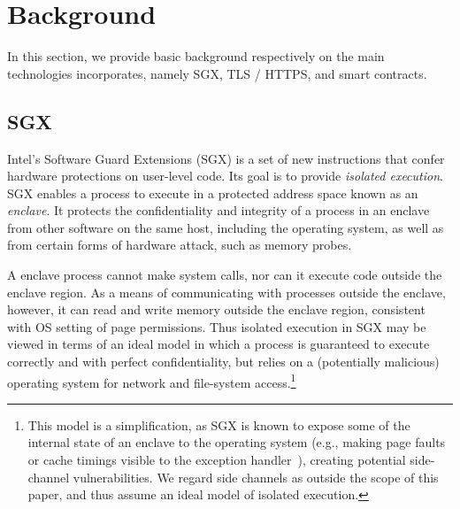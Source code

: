 \section{Background}
In this section, we provide basic background respectively on the main technologies \tc incorporates, namely SGX, TLS / HTTPS, and smart contracts.

\subsection{SGX}
Intel's Software Guard Extensions (SGX) is a set of new instructions that confer hardware protections on user-level code. Its goal is to provide \emph{isolated execution}. SGX enables a process to execute in a protected address space known as an {\em enclave}. It protects the confidentiality and integrity of a process in an enclave from other software on the same host, including the operating system, as well as from certain forms of hardware attack, such as memory probes. 

A enclave process cannot make system calls, nor can it execute code outside the enclave region. As a means of communicating with processes outside the enclave, however, it can read and write memory outside the enclave region, consistent with OS setting of page permissions. Thus  isolated execution in SGX may be viewed in terms of an ideal model in which a process is guaranteed to execute correctly and with perfect confidentiality, but relies on a (potentially malicious) operating system for network and file-system access.\footnote{This model is a simplification, as SGX is known to expose some of the internal state of an enclave to the operating system (e.g., making page faults or cache timings visible to the exception handler~\cite{sgxexplained}), creating potential side-channel vulnerabilities. We regard side channels as outside the scope of this paper, and thus assume an ideal model of isolated execution.}

